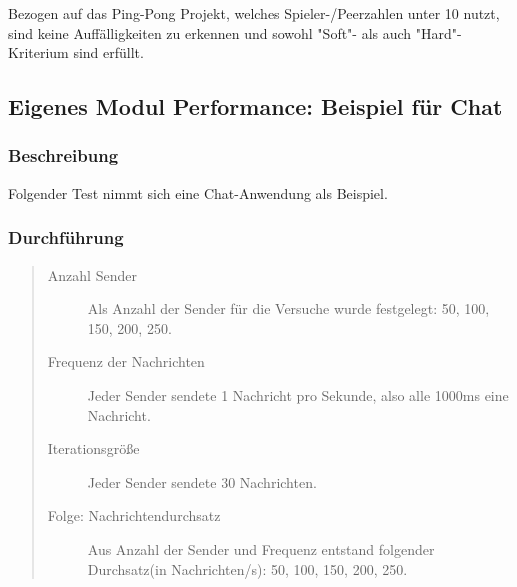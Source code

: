 Bezogen auf das Ping-Pong Projekt, welches Spieler-/Peerzahlen unter 10 nutzt, sind keine Auffälligkeiten zu erkennen und sowohl "Soft"- als auch "Hard"-Kriterium sind erfüllt.




\subsection{Eigenes Modul Performance: Beispiel für Chat}

\subsubsection{Beschreibung}
Folgender Test nimmt sich eine Chat-Anwendung als Beispiel.



\subsubsection{Durchführung}
\begin{quote}
  \begin{description}
  \item[Anzahl Sender]
  Als Anzahl der Sender für die Versuche wurde festgelegt: 50, 100, 150, 200, 250.

  \item[Frequenz der Nachrichten]
  Jeder Sender sendete 1 Nachricht pro Sekunde, also alle 1000ms eine Nachricht.

  \item[Iterationsgröße]
  Jeder Sender sendete 30 Nachrichten.

  \item[Folge: Nachrichtendurchsatz]
  Aus Anzahl der Sender und Frequenz entstand folgender Durchsatz(in Nachrichten/s): 50, 100, 150, 200, 250.
  \end{description}
\end{quote}



